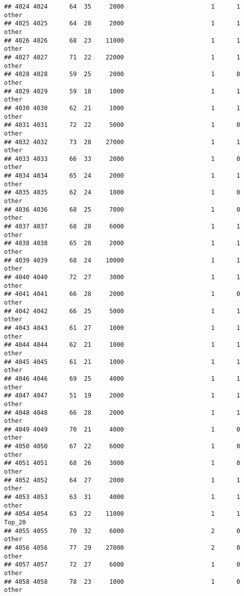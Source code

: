 \documentclass[
]{article}
\begin{document}
\begin{verbatim}
## 4024 4024      64  35     2000                        1      1    other
## 4025 4025      64  28     2000                        1      1    other
## 4026 4026      68  23    11000                        1      1    other
## 4027 4027      71  22    22000                        1      1    other
## 4028 4028      59  25     2000                        1      0    other
## 4029 4029      59  18     1000                        1      1    other
## 4030 4030      62  21     1000                        1      1    other
## 4031 4031      72  22     5000                        1      0    other
## 4032 4032      73  28    27000                        1      1    other
## 4033 4033      66  33     2000                        1      0    other
## 4034 4034      65  24     2000                        1      1    other
## 4035 4035      62  24     1000                        1      0    other
## 4036 4036      68  25     7000                        1      0    other
## 4037 4037      68  28     6000                        1      1    other
## 4038 4038      65  28     2000                        1      1    other
## 4039 4039      68  24    10000                        1      1    other
## 4040 4040      72  27     3000                        1      1    other
## 4041 4041      66  28     2000                        1      0    other
## 4042 4042      66  25     5000                        1      1    other
## 4043 4043      61  27     1000                        1      1    other
## 4044 4044      62  21     1000                        1      1    other
## 4045 4045      61  21     1000                        1      1    other
## 4046 4046      69  25     4000                        1      1    other
## 4047 4047      51  19     2000                        1      1    other
## 4048 4048      66  28     2000                        1      1    other
## 4049 4049      70  21     4000                        1      0    other
## 4050 4050      67  22     6000                        1      0    other
## 4051 4051      68  26     3000                        1      0    other
## 4052 4052      64  27     2000                        1      1    other
## 4053 4053      63  31     4000                        1      1    other
## 4054 4054      63  22    11000                        1      1   Top_20
## 4055 4055      70  32     6000                        2      0    other
## 4056 4056      77  29    27000                        2      0    other
## 4057 4057      72  27     6000                        1      0    other
## 4058 4058      78  23     1000                        1      0    other

\end{verbatim}
\end{document}

